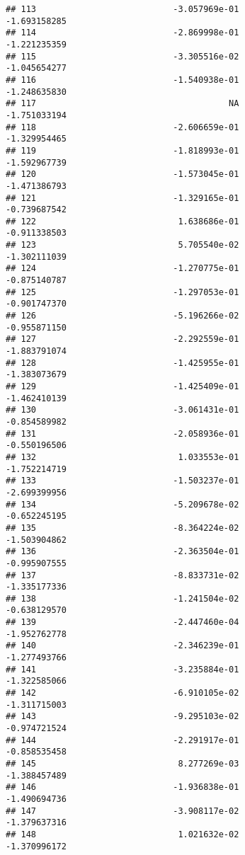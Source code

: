 \documentclass[
]{article}
\begin{document}
\begin{verbatim}
## 113                           -3.057969e-01               -1.693158285
## 114                           -2.869998e-01               -1.221235359
## 115                           -3.305516e-02               -1.045654277
## 116                           -1.540938e-01               -1.248635830
## 117                                      NA               -1.751033194
## 118                           -2.606659e-01               -1.329954465
## 119                           -1.818993e-01               -1.592967739
## 120                           -1.573045e-01               -1.471386793
## 121                           -1.329165e-01               -0.739687542
## 122                            1.638686e-01               -0.911338503
## 123                            5.705540e-02               -1.302111039
## 124                           -1.270775e-01               -0.875140787
## 125                           -1.297053e-01               -0.901747370
## 126                           -5.196266e-02               -0.955871150
## 127                           -2.292559e-01               -1.883791074
## 128                           -1.425955e-01               -1.383073679
## 129                           -1.425409e-01               -1.462410139
## 130                           -3.061431e-01               -0.854589982
## 131                           -2.058936e-01               -0.550196506
## 132                            1.033553e-01               -1.752214719
## 133                           -1.503237e-01               -2.699399956
## 134                           -5.209678e-02               -0.652245195
## 135                           -8.364224e-02               -1.503904862
## 136                           -2.363504e-01               -0.995907555
## 137                           -8.833731e-02               -1.335177336
## 138                           -1.241504e-02               -0.638129570
## 139                           -2.447460e-04               -1.952762778
## 140                           -2.346239e-01               -1.277493766
## 141                           -3.235884e-01               -1.322585066
## 142                           -6.910105e-02               -1.311715003
## 143                           -9.295103e-02               -0.974721524
## 144                           -2.291917e-01               -0.858535458
## 145                            8.277269e-03               -1.388457489
## 146                           -1.936838e-01               -1.490694736
## 147                           -3.908117e-02               -1.379637316
## 148                            1.021632e-02               -1.370996172

\end{verbatim}
\end{document}
